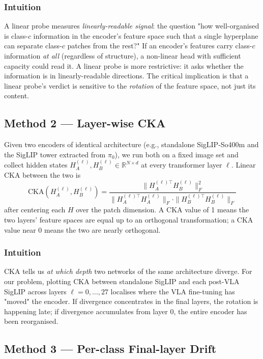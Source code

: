 \documentclass[11pt]{article}
\begin{document}
\subsubsection{Intuition}

A linear probe measures \emph{linearly-readable signal}: the question
"how well-organised is class-$c$ information in the encoder's feature
space such that a single hyperplane can separate class-$c$ patches from
the rest?" If an encoder's features carry class-$c$ information
\emph{at all} (regardless of structure), a non-linear head with
sufficient capacity could read it. A linear probe is more restrictive: it
asks whether the information is in linearly-readable directions. The
critical implication is that a linear probe's verdict is sensitive to
the \emph{rotation} of the feature space, not just its content.

\subsection{Method 2 --- Layer-wise CKA}

Given two encoders of identical architecture (e.g., standalone
SigLIP-So400m and the SigLIP tower extracted from $\pi_0$), we run both
on a fixed image set and collect hidden states
$H^{(\ell)}_A, H^{(\ell)}_B \in \mathbb{R}^{N \times d}$ at every
transformer layer $\ell$. Linear CKA between the two is
\[
\mathrm{CKA}\!\left(H^{(\ell)}_A, H^{(\ell)}_B\right) =
\frac{\| H^{(\ell)\top}_A H^{(\ell)}_B \|_F^2}
     {\| H^{(\ell)\top}_A H^{(\ell)}_A \|_F \cdot \| H^{(\ell)\top}_B H^{(\ell)}_B \|_F}
\]
after centering each $H$ over the patch dimension. A CKA value of 1
means the two layers' feature spaces are equal up to an orthogonal
transformation; a CKA value near 0 means the two are nearly orthogonal.

\subsubsection{Intuition}

CKA tells us \emph{at which depth} two networks of the same architecture
diverge. For our problem, plotting CKA between standalone SigLIP and
each post-VLA SigLIP across layers $\ell = 0, \ldots, 27$ localises
where the VLA fine-tuning has "moved" the encoder. If divergence
concentrates in the final layers, the rotation is happening late; if
divergence accumulates from layer 0, the entire encoder has been
reorganised.

\subsection{Method 3 --- Per-class Final-layer Drift}
\end{document}
